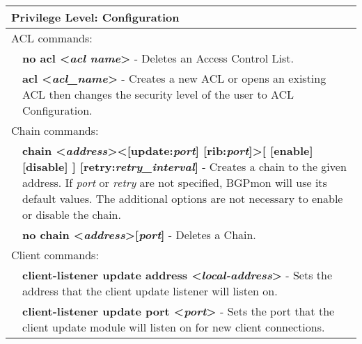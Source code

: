\newpage
\begin{tabular}{|p{10pt}p{400pt}|}
\hline

\multicolumn{2}{|l|}{{\bf Privilege Level:} Configuration }\\

\hline

\multicolumn{2}{|l|}{ACL commands:}\\ 

\hline

& {\bf \small no acl \textless\emph{acl name}\textgreater} - Deletes an Access Control List.\\[4pt]

& {\bf \small acl \textless\emph{acl\_name}\textgreater} - Creates a new ACL or opens an existing ACL then changes the security level of the user to ACL Configuration.\\[4pt]

\hline

\multicolumn{2}{|l|}{Chain commands:}\\ 

\hline

& {\bf \small chain \textless\emph{address}\textgreater \textless[update:\emph{port}] [rib:\emph{port}]\textgreater [ [enable] [disable] ]  [retry:\emph{retry\_interval}]} - Creates a chain to the given address.  If \emph{port} or \emph{retry} are not specified, BGPmon will use its default values.  The additional options are not necessary to enable or disable the chain.\\[4pt]

& {\bf \small no chain \textless\emph{address}\textgreater [\emph{port}]} - Deletes a Chain.\\[4pt]

\hline

\multicolumn{2}{|l|}{Client commands:}\\ 

\hline

& {\bf \small client-listener update address \textless\emph{local-address}\textgreater} - Sets the address that the client update listener will listen on.\\[4pt]

& {\bf \small client-listener update port \textless\emph{port}\textgreater} - Sets the port that the client update module will listen on for new client connections.\\[4pt]


\end{tabular}
